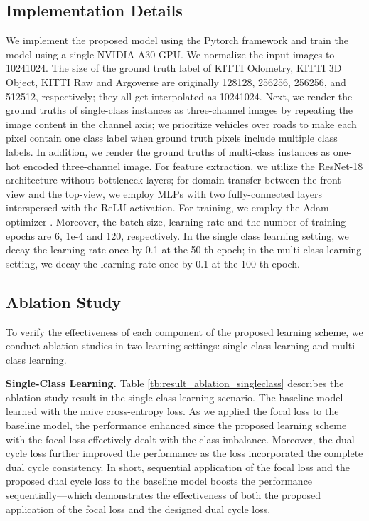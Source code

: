 \subsection{Implementation Details}
We implement the proposed model using the Pytorch framework and train the model using a single NVIDIA A30 GPU. We normalize the input images to 10241024. The size of the ground truth label of KITTI Odometry, KITTI 3D Object, KITTI Raw and Argoverse are originally 128128, 256256, 256256, and 512512, respectively; they all get interpolated as 10241024. Next, we render the ground truths of single-class instances as three-channel images by repeating the image content in the channel axis; we prioritize vehicles over roads to make each pixel contain one class label when ground truth pixels include multiple class labels. In addition, we render the ground truths of multi-class instances as one-hot encoded three-channel image. For feature extraction, we utilize the ResNet-18 architecture \cite{he2016deep} without bottleneck layers; for domain transfer between the front-view and the top-view, we employ MLPs with two fully-connected layers interspersed with the ReLU activation. For training, we employ the Adam optimizer \cite{kingma2015adam}. Moreover, the batch size, learning rate and the number of training epochs are 6, 1e-4 and 120, respectively. In the single class learning setting, we decay the learning rate once by 0.1 at the 50-th epoch; in the multi-class learning setting, we decay the learning rate once by 0.1 at the 100-th epoch. 
\subsection{Ablation Study}
To verify the effectiveness of each component of the proposed learning scheme, we conduct ablation studies in two learning settings: single-class learning and multi-class learning.

\textbf{Single-Class Learning.} Table \ref{tb:result_ablation_singleclass} describes the ablation study result in the single-class learning scenario. The baseline model learned with the naive cross-entropy loss. As we applied the focal loss to the baseline model, the performance enhanced since the proposed learning scheme with the focal loss effectively dealt with the class imbalance. Moreover, the dual cycle loss further improved the performance as the loss incorporated the complete dual cycle consistency. In short, sequential application of the focal loss and the proposed dual cycle loss to the baseline model boosts the performance sequentially---which demonstrates the effectiveness of both the proposed application of the focal loss and the designed dual cycle loss.

